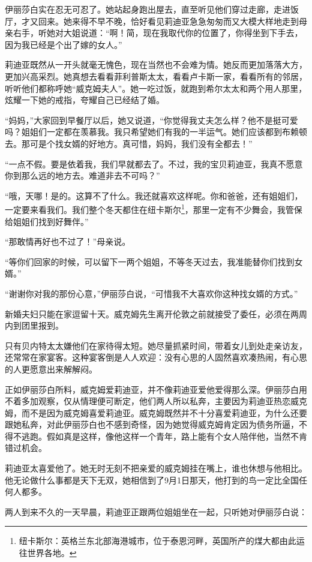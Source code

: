 \par 伊丽莎白实在忍无可忍了。她站起身跑出屋去，直至听见他们穿过走廊，走进饭厅，才又回来。她来得不早不晚，恰好看见莉迪亚急急匆匆而又大模大样地走到母亲右手，听她对大姐说道：“啊！简，现在我取代你的位置了，你得坐到下手去，因为我已经是个出了嫁的女人。”
\par 莉迪亚既然从一开头就毫无愧色，现在当然也不会难为情。她反而更加落落大方，更加兴高采烈。她真想去看看菲利普斯太太，看看卢卡斯一家，看看所有的邻居，听听他们都称呼她“威克姆夫人”。她一吃过饭，就跑到希尔太太和两个用人那里，炫耀一下她的戒指，夸耀自己已经结了婚。
\par “妈妈，”大家回到早餐厅以后，她又说道，“你觉得我丈夫怎么样？他不是挺可爱吗？姐姐们一定都在羡慕我。我只希望她们有我的一半运气。她们应该都到布赖顿去。那可是个找女婿的好地方。真可惜，妈妈，我们没有全都去！”
\par “一点不假。要是依着我，我们早就都去了。不过，我的宝贝莉迪亚，我真不愿意你到那么远的地方去。难道非去不可吗？”
\par “哦，天哪！是的。这算不了什么。我还就喜欢这样呢。你和爸爸，还有姐姐们，一定要来看我们。我们整个冬天都住在纽卡斯尔\footnote{纽卡斯尔：英格兰东北部海港城市，位于泰恩河畔，英国所产的煤大都由此运往世界各地。}，那里一定有不少舞会，我管保给姐姐们找到好舞伴。”
\par “那敢情再好也不过了！”母亲说。
\par “等你们回家的时候，可以留下一两个姐姐，不等冬天过去，我准能替你们找到女婿。”
\par “谢谢你对我的那份心意，”伊丽莎白说，“可惜我不大喜欢你这种找女婿的方式。”
\par 新婚夫妇只能在家逗留十天。威克姆先生离开伦敦之前就接受了委任，必须在两周内到团里报到。
\par 只有贝内特太太嫌他们在家待得太短。她尽量抓紧时间，带着女儿到处走亲访友，还常常在家宴客。这种宴客倒是人人欢迎：没有心思的人固然喜欢凑热闹，有心思的人更愿意出来解解闷。
\par 正如伊丽莎白所料，威克姆爱莉迪亚，并不像莉迪亚爱他爱得那么深。伊丽莎白用不着多加观察，仅从情理便可断定，他们两人所以私奔，主要因为莉迪亚热恋威克姆，而不是因为威克姆喜爱莉迪亚。威克姆既然并不十分喜爱莉迪亚，为什么还要跟她私奔，对此伊丽莎白也不感到奇怪，因为她觉得威克姆肯定因为债务所逼，不得不逃跑。假如真是这样，像他这样一个青年，路上能有个女人陪伴他，当然不肯错过机会。
\par 莉迪亚太喜爱他了。她无时无刻不把亲爱的威克姆挂在嘴上，谁也休想与他相比。他无论做什么事都是天下无双，她相信到了9月1日那天，他打到的鸟一定比全国任何人都多。
\par 两人到来不久的一天早晨，莉迪亚正跟两位姐姐坐在一起，只听她对伊丽莎白说：
